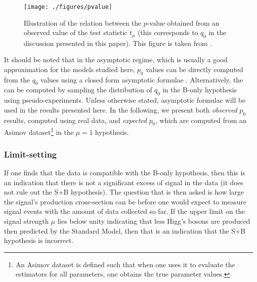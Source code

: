 \begin{figure}[htbp]
    \centering
    \texttt{[image: ./figures/pvalue]}
    \caption{Illustration of the relation between the $p$-value obtained from an
    observed value of the test statistic $t_{\mu}$ (this corresponds to $q_0$ in
    the discussion presented in this paper). This figure is taken from 
    \cite{Cowan:2010js}.}
    \label{fig:pvalue}
\end{figure}

It should be noted that in the asymptotic regime, which is usually a good
approximation for the models studied here, $p_0$ values can be directly computed
from the $q_0$ values using a closed form asymptotic formulae \cite{Cowan:2010js}.
Alternatively, the \pzero can be computed by sampling the distribution of $q_0$
in the B-only hypothesis using pseudo-experiments. Unless otherwise stated, 
asymptotic formulae will be used in the results presented here. In the following,
we present both \emph{observed} $p_0$ results, computed using real data, and
\emph{expected} $p_0$, which are computed from an Asimov dataset\footnote{
An Asimov dataset is defined such that when one uses it to evaluate the 
estimators for all parameters, one obtains the true parameter values.}
in the $\mu = 1$ hypothesis.

\subsubsection{Limit-setting}
If one finds that the data is compatible with the B-only hypothesis, then this
is an indication that there is not a significant excess of signal in the data
(it does not rule out the S+B hypothesis). The question that is then asked is
how large the signal's production cross-section can be before one would expect
to measure signal events with the amount of data collected so far. 
If the upper limit on the signal strength $\mu$ lies
below unity indicating that less Higg's bosons are produced then predicted by 
the Standard Model, then that is an indication that the S+B hypothesis is incorrect.

